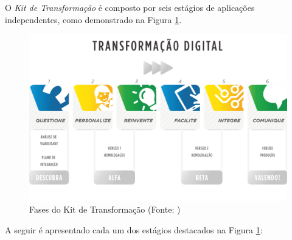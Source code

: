 O \textit{Kit de Transformação} é composto por seis estágios de aplicações independentes, como demonstrado na Figura \ref{fig:EtapasTransform}.

        \begin{figure}[h]
          \centering
          \includegraphics[width=15cm]{figuras/secao-referencial/EtapasTransform.png}
          \caption{Fases do Kit de Transformação (Fonte: \cite{BRASIL2017})} 
          \label{fig:EtapasTransform}
        \end{figure}
        
        
A seguir é apresentado cada um dos estágios destacados na Figura \ref{fig:EtapasTransform}:

